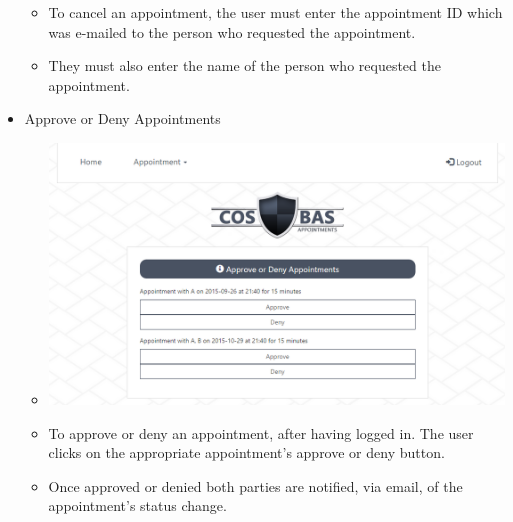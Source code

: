 \begin{itemize}
\begin{itemize}
				\item To cancel an appointment, the user must enter the appointment ID which was e-mailed to the person who requested the appointment.
				\item They must also enter the name of the person who requested the appointment.
			\end{itemize}
		\item Approve or Deny Appointments
			\begin{itemize}
				\item \includegraphics[width=\linewidth]{images/Screenshots/Approve_Deny.png}
				\item To approve or deny an appointment, after having logged in. The user clicks on the appropriate appointment's approve or deny button.
				\item Once approved or denied both parties are notified, via email, of the appointment's status change.
			\end{itemize}
	\end{itemize}